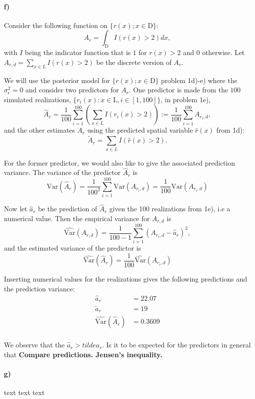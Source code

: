 \paragraph{f)}
Consider the following function on $\{r(x); x \in \text{D}\}$:
\begin{equation}
    A_r = \int_{\text{D}} I(r(x)>2)dx,
\end{equation}
with $I$ being the indicator function that is $1$ for $r(x)>2$ and $0$ otherwise. Let $A_{r,d} = \sum_{x \in L} I(r(x)>2)$ be the discrete version of $A_r$.

We will use the posterior model for $\{r(x); x \in \text{D}\}$ problem 1d)-e) where the $\sigma^2_{\epsilon} = 0$ and consider two predictors for $A_r$. One predictor is made from the $100$ simulated realizations, $\{r_i(x): x \in \text{L}, i \in [1,100]\}$, in problem 1e),
\begin{equation*}
    \hat{A}_r = \frac{1}{100}\sum_{i=1}^{100} \left(\sum_{x \in L} I(r_i(x)>2)\right) := \frac{1}{100}\sum_{i=1}^{100} A_{r_i,d},
\end{equation*}
and the other estimates $A_r$ using the predicted spatial variable $\hat{r}(x)$ from 1d):
\begin{equation*}
    \tilde{A}_r = \sum_{x \in L} I(\hat{r}(x)>2).
\end{equation*}

For the former predictor, we would also like to give the associated prediction variance. The variance of the predictor $\hat{A}_r$ is
\begin{equation*}
    \text{Var}(\hat{A}_{r}) = \frac{1}{100^2}\sum_{i=1}^{100}\text{Var}(A_{r_i,d}) = \frac{1}{100}\text{Var}(A_{r_i,d})
\end{equation*}

Now let $\hat{a}_r$ be the prediction of $\hat{A}_r$ given the 100 realizations from 1e), i.e a numerical value. Then the empirical variance for $A_{r,d}$ is 
\begin{equation*}
    \hat{\text{Var}}(A_{r,d}) = \frac{1}{100-1} \sum_{i=1}^{100}  (A_{r_i,d}-\hat{a}_r)^2, 
\end{equation*}
and the estimated variance of the predictor is 
\begin{equation*}
    \hat{\text{Var}}(\hat{A}_{r}) = \frac{1}{100}\hat{\text{Var}}(A_{r_i,d})
\end{equation*}

Inserting numerical values for the realizations gives the following predictions and the prediction variance:
\begin{align*}
    \hat{a}_r & = 22.07\\
    \tilde{a}_r & = 19\\
    \hat{\text{Var}}(\hat{A}_{r}) & = 0.3609\\
\end{align*}

We observe that the $\hat{a}_r > tilde{a}_r$. 
Is it to be expected for the predictors in general that 
\textbf{Compare predictions. Jensen's inequality.}
\paragraph{g)}
text text text
